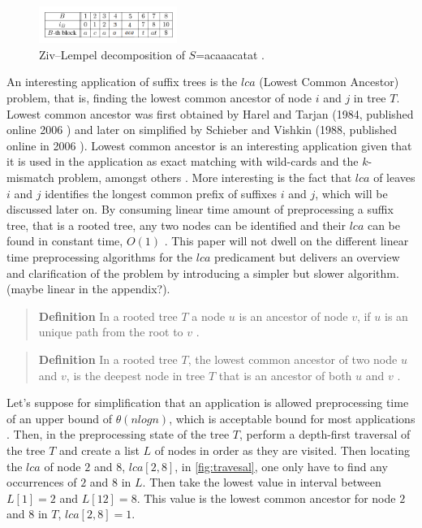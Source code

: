 \documentclass[12pt]{article} %
\begin{document}
\begin{figure}[H]
    \centering
    \includegraphics[width=0.4\textwidth]{Lempeltrue}
    \captionsetup{width=0.8
    \textwidth}
    \caption{Ziv–Lempel decomposition of $S$=acaaacatat \cite{enchancedsuffix}.}
    \label{fig:Lempeltrue}
\end{figure}

An interesting application of suffix trees is the $lca$ (Lowest Common Ancestor) problem, that is, finding the lowest common ancestor of node $i$ and $j$ in tree $T$. 
Lowest common ancestor was first obtained by Harel and Tarjan (1984, published online 2006 \cite{lcaWeb}) and later on simplified by Schieber and Vishkin (1988, published online in 2006 \cite{lcaWebSch})\cite{gusfield}.
\newline
Lowest common ancestor is an interesting application given that it is used in the application as exact matching with wild-cards and the $k$-mismatch problem, amongst others \cite{gusfield}. More interesting is the fact that $lca$ of leaves $i$ and $j$ identifies the longest common prefix of suffixes $i$ and $j$, which will be discussed later on.
\newline
By consuming linear time amount of preprocessing a suffix tree, that is a rooted tree, any two nodes can be identified and their $lca$ can be found in constant time, $O(1)$ \cite{gusfield, lca}. This paper will not dwell on the different linear time preprocessing algorithms for the $lca$ predicament but delivers an overview and clarification of the problem by introducing a simpler but slower algorithm. (maybe linear in the appendix?).
\begin{quote}
\textbf{Definition}   In a rooted tree $T$ a node $u$ is an ancestor of node $v$, if $u$ is an unique path from the root to $v$ \cite{gusfield}.
\end{quote}
\begin{quote}
\textbf{Definition}   In a rooted tree $T$, the lowest common ancestor of two node $u$ and $v$, is the deepest node in tree $T$ that is an ancestor of both $u$ and $v$ \cite{gusfield}.
\end{quote}
Let’s suppose for simplification that an application is allowed preprocessing time of an upper bound of $\theta (n log n)$, which is acceptable bound for most applications \cite{gusfield}. Then, in the preprocessing state of the tree $T$, perform a depth-first traversal of the tree $T$ and create a list $L$ of nodes in order as they are visited. Then locating the $lca$ of node $2$ and $8$, $lca[2,8]$, in \cref{fig:travesal}, one only have to find any occurrences of $2$ and $8$ in $L$. Then take the lowest value in interval between $L[1] = 2$ and $L[12]=8$. This value is the lowest common ancestor for node $2$ and $8$ in $T$, $lca[2,8]=1$.
\end{document}
